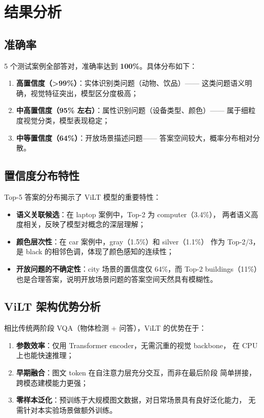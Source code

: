 \documentclass[UTF8,a4paper,12pt,fontset=none]{ctexart}
\begin{document}
\section{结果分析}

\subsection{准确率}

5 个测试案例全部答对，准确率达到 \textbf{100\%}。具体分布如下：

\begin{enumerate}[leftmargin=2.2em]
  \item \textbf{高置信度（>99\%）}：实体识别类问题（动物、饮品）——
    这类问题语义明确，视觉特征突出，模型区分度极高；
  \item \textbf{中高置信度（95\% 左右）}：属性识别问题（设备类型、颜色）——
    属于细粒度视觉分类，模型表现稳定；
  \item \textbf{中等置信度（64\%）}：开放场景描述问题——
    答案空间较大，概率分布相对分散。
\end{enumerate}

\subsection{置信度分布特性}

Top-5 答案的分布揭示了 ViLT 模型的重要特性：

\begin{itemize}[leftmargin=2.2em]
  \item \textbf{语义关联候选}：在 laptop 案例中，Top-2 为 computer（3.4\%），
    两者语义高度相关，反映了模型对概念的深层理解；
  \item \textbf{颜色层次性}：在 car 案例中，gray（1.5\%）和 silver（1.1\%）
    作为 Top-2/3，是 black 的相邻色调，体现了颜色感知的连续性；
  \item \textbf{开放问题的不确定性}：city 场景的置信度仅 64\%，而 Top-2
    buildings（11\%）也是合理答案，说明开放场景问题的答案空间天然具有模糊性。
\end{itemize}

\subsection{ViLT 架构优势分析}

相比传统两阶段 VQA（物体检测 + 问答），ViLT 的优势在于：

\begin{enumerate}[leftmargin=2.2em]
  \item \textbf{参数效率}：仅用 Transformer encoder，无需沉重的视觉 backbone，
    在 CPU 上也能快速推理；
  \item \textbf{早期融合}：图文 token 在自注意力层充分交互，而非在最后阶段
    简单拼接，跨模态建模能力更强；
  \item \textbf{零样本泛化}：预训练于大规模图文数据，对日常场景具有良好泛化能力，
    无需针对本实验场景做额外训练。
\end{enumerate}
\end{document}
